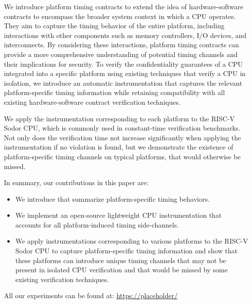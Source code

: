We introduce platform timing contracts to extend the idea of hardware-software contracts to encompass the broader system context in which a CPU operates.
They aim to capture the timing behavior of the entire platform, including interactions with other components such as memory controllers, I/O devices, and interconnects.
By considering these interactions, platform timing contracts can provide a more comprehensive understanding of potential timing channels and their implications for security.
To verify the confidentiality guarantees of a CPU integrated into a specific platform using existing techniques that verify a CPU in isolation, we introduce an automatic instrumentation that captures the relevant platform-specific timing information while retaining compatibility with all existing hardware-software contract verification techniques.

We apply the instrumentation corresponding to each platform to the RISC-V Sodor CPU, which is commonly used in constant-time verification benchmarks.
Not only does the verification time not increase significantly when applying the instrumentation if no violation is found, but we demonstrate the existence of platform-specific timing channels on typical platforms, that would otherwise be missed.

In summary, our contributions in this paper are:
\begin{itemize}
    \item We introduce \pics that summarize platform-specific timing behaviors.
    \item We implement an open-source lightweight CPU instrumentation that accounts for all platform-induced timing side-channels.
    \item We apply instrumentations corresponding to various platforms to the RISC-V Sodor CPU to capture platform-specific timing information and show that these platforms can introduce unique timing channels that may not be present in isolated CPU verification and that would be missed by some existing verification techniques.
\end{itemize}

All our experiments can be found at: \url{https://placeholder/} 
